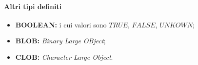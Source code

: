 \paragraph{Altri tipi definiti}%
\label{par:Altri tipi definiti}
\begin{itemize}
  \item \textbf{BOOLEAN:} i cui valori sono $TRUE$, $FALSE$, $UNKOWN$;
  \item \textbf{BLOB:} \emph{Binary Large OBject};
  \item \textbf{CLOB:} \emph{Character Large Object}.
\end{itemize}
